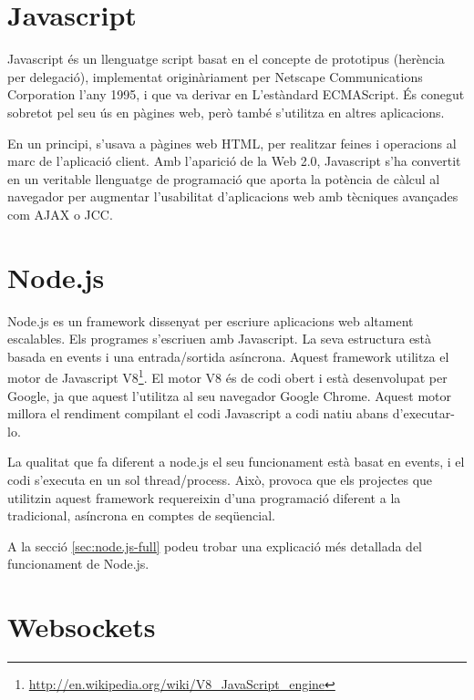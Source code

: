 \section{Javascript}

Javascript és un llenguatge script basat en el concepte de prototipus (herència per delegació), implementat originàriament per Netscape Communications Corporation l'any 1995, i que va derivar en L'estàndard ECMAScript. És conegut sobretot pel seu ús en pàgines web, però també s'utilitza en altres aplicacions.

En un principi, s'usava a pàgines web HTML, per realitzar feines i operacions al marc de l'aplicació client. Amb l'aparició de la Web 2.0, Javascript s'ha convertit en un veritable llenguatge de programació que aporta la potència de càlcul al navegador per augmentar l'usabilitat d'aplicacions web amb tècniques avançades com AJAX o JCC.


\section{Node.js}
\label{sec:node.js-min}
Node.js es un framework dissenyat per escriure aplicacions web altament escalables. Els programes s'escriuen amb Javascript. La seva estructura està basada en events i una entrada/sortida asíncrona. Aquest framework utilitza el motor de Javascript V8\footnote{\url{http://en.wikipedia.org/wiki/V8_JavaScript_engine}}. El motor V8 és de codi obert i està desenvolupat per Google, ja que aquest l'utilitza al seu navegador Google Chrome. Aquest motor millora el rendiment compilant el codi Javascript a codi natiu abans d'executar-lo.

La qualitat que fa diferent a node.js el seu funcionament està basat en events, i el codi s'executa en un sol thread/process. Això, provoca que els projectes que utilitzin aquest framework requereixin d'una programació diferent a la tradicional, asíncrona en comptes de seqüencial. 

A la secció \ref{sec:node.js-full} podeu trobar una explicació més detallada del funcionament de Node.js.


\section{Websockets}
\label{sec:websockets}

